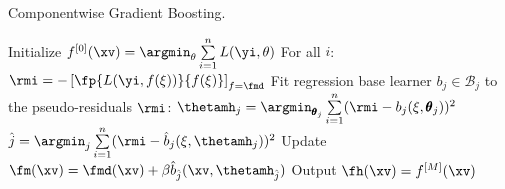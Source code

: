 
\begin{algorithm}[H]
  \begin{footnotesize}
  \begin{center}
  \caption{Componentwise Gradient Boosting.}
    \begin{algorithmic}[1]
      \State Initialize $f^{[0]}(\xv) = \argmin_{\theta} \sum  \limits_{i=1}^n L(\yi, \theta)$
        \State For all $i$: $\rmi = -\left[\fp{L(\yi, f(\xi))}{f(\xi)}\right]_{f=\fmd}$
          \State Fit regression base learner $b_j \in \mathcal{B}_j$ to the pseudo-residuals $\rmi$:
          \State $\thetamh_j = \argmin_{\pmb\theta_j} \sum  \limits_{i=1}^n 
          (\rmi - b_j(\xi, \pmb\theta_j))^2$
        \EndFor
        \State $\hat{j} = \argmin_{j} \sum  \limits_{i=1}^n (\rmi - \hat{b}_j(\xi, \thetamh_j))^2$
        \State Update $\fm(\xv) = \fmd(\xv) + \beta \hat{b}_{\hat{j}}(\xv, \thetamh_{\hat{j}})$
      \EndFor
      \State Output $\fh(\xv) = f^{[M]}(\xv)$
    \end{algorithmic}
    \end{center}
    \end{footnotesize}
\end{algorithm}
